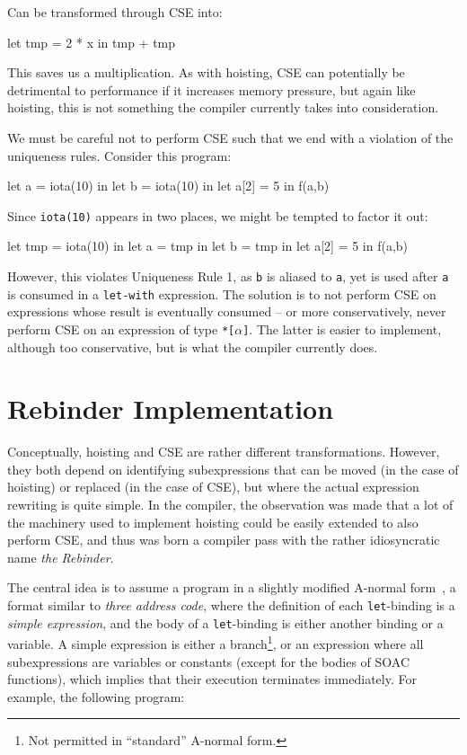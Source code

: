 Can be transformed through CSE into:

\begin{colorcode}
let tmp = 2 * x in
tmp + tmp
\end{colorcode}

This saves us a multiplication.  As with hoisting, CSE can potentially
be detrimental to performance if it increases memory pressure, but
again like hoisting, this is not something the \LO{} compiler
currently takes into consideration.

We must be careful not to perform CSE such that we end with a
violation of the uniqueness rules.  Consider this program:

\begin{colorcode}
let a = iota(10) in
let b = iota(10) in
let a[2] = 5 in
f(a,b)
\end{colorcode}

Since \texttt{iota(10)} appears in two places, we might be tempted to
factor it out:

\begin{colorcode}
let tmp = iota(10) in
let a = tmp in
let b = tmp in
let a[2] = 5 in
f(a,b)
\end{colorcode}

However, this violates Uniqueness Rule 1, as \texttt{b} is aliased to
\texttt{a}, yet is used after \texttt{a} is consumed in a
\texttt{let-with} expression.  The solution is to not perform CSE on
expressions whose result is eventually consumed -- or more
conservatively, never perform CSE on an expression of type
\texttt{*[$\alpha$]}.  The latter is easier to implement, although too
conservative, but is what the \LO{} compiler currently does.

\section{Rebinder Implementation}
\label{sec:rebinder}

Conceptually, hoisting and CSE are rather different transformations.
However, they both depend on identifying subexpressions that can be
moved (in the case of hoisting) or replaced (in the case of CSE), but
where the actual expression rewriting is quite simple.  In the \LO{}
compiler, the observation was made that a lot of the machinery used to
implement hoisting could be easily extended to also perform CSE, and
thus was born a compiler pass with the rather idiosyncratic name
\textit{the Rebinder}.

The central idea is to assume a program in a slightly modified
A-normal form~\cite{Sabry:1992:RPC:141478.141563}, a format similar to
\textit{three address code}, where the definition of each
\texttt{let}-binding is a \textit{simple expression}, and the body of
a \texttt{let}-binding is either another binding or a variable.  A
simple expression is either a branch\footnote{Not permitted in
  ``standard'' A-normal form.}, or an expression where all
subexpressions are variables or constants (except for the bodies of
SOAC functions), which implies that their execution terminates
immediately.  For example, the following program:

